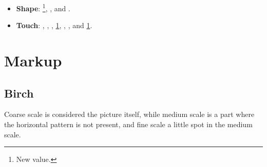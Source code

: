\documentclass[12pt,a4paper]{article}
\begin{document}
\begin{singlespace}
\begin{itemize}
	\item \textbf{Shape}: \sfl\footnote{\label{new}New value.}, \sro, \sexor and \sexdi.
	\item \textbf{Touch}: \tfu, \tfe, \tco, \tro\cref{new}, \tbu, \tsc, \tsm and \tve\cref{new}.
\end{itemize}

\section{Markup}

\newcommand{\imageSize}{0.30}
\newcommand{\dataSize}{0.65}
\newcommand{\spaceSize}{0.02}

\newcommand{\mat}{Birch}
\newcommand{\Number}{01}
\newcommand{\InputImage}[8]{
\begin{figure}[!ht]
    \centering
    \begin{minipage}{\imageSize\textwidth}
        \centering
        \texttt{[image: ../Dataset/\\mat/\\Number.png]}
    \end{minipage}
    \hspace{\spaceSize\textwidth}
    \begin{minipage}{\dataSize\textwidth}
        \textbf{\large \mat \xspace \Number}:

        #7
        \begin{itemize}
            \item \Fine: #1, #2.
            \item \Medium: #3, #4.
            \item \Coarse: #5, #6.
        \end{itemize}
        #8
    \end{minipage}
\end{figure}
\FloatBarrier    
}

\renewcommand{\mat}{Birch}
\subsection{\mat}
Coarse scale is considered the picture itself, while medium scale is a part where the horizontal pattern is not present, and fine scale a little spot in the medium scale.


\end{singlespace}
\end{document}

